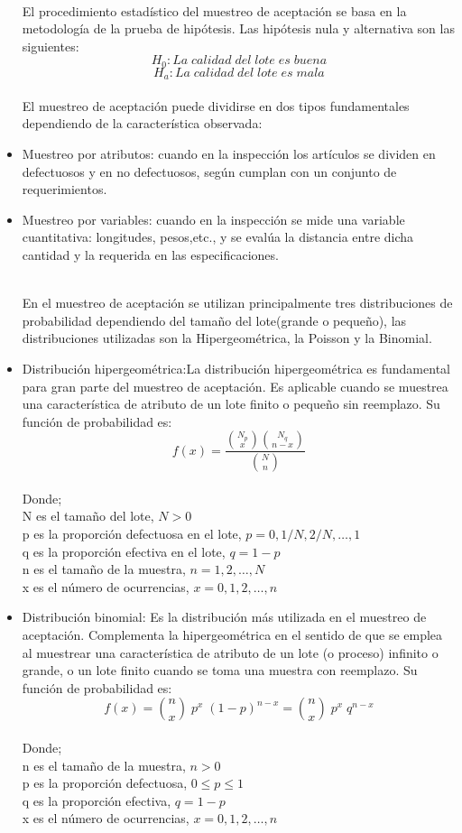 \begin{itemize}
~\\El procedimiento estad\'{i}stico del muestreo de aceptaci\'{o}n se basa en la metodolog\'{i}a de la prueba de hip\'{o}tesis. Las hip\'{o}tesis nula y alternativa son las siguientes:
$$H_0:La \; calidad \; del \; lote \; es \; buena$$
$$H_a:La \; calidad \; del \; lote \; es \; mala$$
~\\El muestreo de aceptaci\'{o}n puede dividirse en dos tipos fundamentales dependiendo de la caracter\'{i}stica observada:

\item Muestreo por atributos: cuando en la inspecci\'{o}n los art\'{i}culos se dividen en defectuosos y en no defectuosos, seg\'{u}n cumplan con un conjunto de requerimientos.
\item Muestreo por variables: cuando en la inspecci\'{o}n se mide una variable cuantitativa: longitudes, pesos,etc., y se eval\'{u}a la distancia entre dicha cantidad y la requerida en las especificaciones.

~\\En el muestreo de aceptaci\'{o}n se utilizan principalmente tres distribuciones de probabilidad dependiendo del tama\~{n}o del lote(grande o peque\~{n}o), las distribuciones utilizadas son la Hipergeom\'{e}trica, la Poisson y la Binomial.

\item Distribuci\'{o}n hipergeom\'{e}trica:La distribuci\'{o}n hipergeom\'{e}trica es fundamental para gran parte del muestreo de aceptaci\'{o}n. Es aplicable cuando se muestrea una caracter\'{i}stica de atributo de un lote finito o peque\~{n}o sin reemplazo. Su funci\'{o}n de probabilidad es:
$$f(x)=\frac{\binom{N_p}{x}\binom{N_q}{n-x}}{\binom{N}{n}}$$
~\\ Donde; 
~\\ N es el tama\~{n}o del lote, $N>0$
~\\ p es la proporci\'{o}n defectuosa en el lote, $p=0, 1/N, 2/N, \dots , 1$
~\\ q es la proporci\'{o}n efectiva en el lote,  $q=1-p$
~\\ n es el tama\~{n}o de la muestra, $n = 1, 2,\dots, N$
~\\ x es el n\'{u}mero de ocurrencias, $x = 0, 1, 2,\dots, n$

\item Distribuci\'{o}n binomial: Es la distribuci\'{o}n m\'{a}s utilizada en el muestreo de aceptaci\'{o}n. Complementa la hipergeom\'{e}trica en el sentido de que se emplea al muestrear una caracter\'{i}stica de atributo de un lote (o proceso) infinito o grande, o un lote finito cuando se toma una muestra con reemplazo. Su funci\'{o}n de probabilidad es:
$$f(x)=\binom{n}{x} \; p^x \; (1-p)^{n-x}=\binom{n}{x} \; p^x \; q^{n-x}$$
~\\ Donde; 
~\\ n es el tama\~{n}o de la muestra, $n>0$
~\\ p es la proporci\'{o}n defectuosa, $0\leq p \leq 1$
~\\ q es la proporci\'{o}n efectiva, $q=1-p$
~\\ x es el n\'{u}mero de ocurrencias, $x = 0, 1, 2,\dots, n$


\end{itemize}
